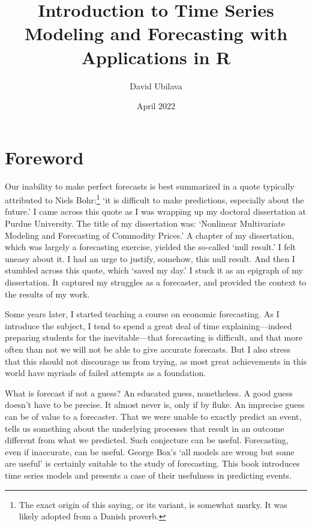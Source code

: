 \documentclass[
  12pt,
  oneside]{book}
\title{Introduction to Time Series Modeling and Forecasting with Applications in R}
\author{David Ubilava}
\date{April 2022}
\begin{document}
\maketitle

{
\setcounter{tocdepth}{1}
\tableofcontents
}
\hypertarget{foreword}{%
\chapter*{Foreword}\label{foreword}}

Our inability to make perfect forecasts is best summarized in a quote typically attributed to Niels Bohr:\footnote{The exact origin of this saying, or its variant, is somewhat murky. It was likely adopted from a Danish proverb.} `it is difficult to make predictions, especially about the future.' I came across this quote as I was wrapping up my doctoral dissertation at Purdue University. The title of my dissertation was: `Nonlinear Multivariate Modeling and Forecasting of Commodity Prices.' A chapter of my dissertation, which was largely a forecasting exercise, yielded the so-called `null result.' I felt uneasy about it. I had an urge to justify, somehow, this null result. And then I stumbled across this quote, which `saved my day.' I stuck it as an epigraph of my dissertation. It captured my struggles as a forecaster, and provided the context to the results of my work.

Some years later, I started teaching a course on economic forecasting. As I introduce the subject, I tend to spend a great deal of time explaining---indeed preparing students for the inevitable---that forecasting is difficult, and that more often than not we will not be able to give accurate forecasts. But I also stress that this should not discourage us from trying, as most great achievements in this world have myriads of failed attempts as a foundation.

What is forecast if not a guess? An educated guess, nonetheless. A good guess doesn't have to be precise. It almost never is, only if by fluke. An imprecise guess can be of value to a forecaster. That we were unable to exactly predict an event, tells us something about the underlying processes that result in an outcome different from what we predicted. Such conjecture can be useful. Forecasting, even if inaccurate, can be useful. George Box's `all models are wrong but some are useful' is certainly suitable to the study of forecasting. This book introduces time series models and presents a case of their usefulness in predicting events.
\end{document}
